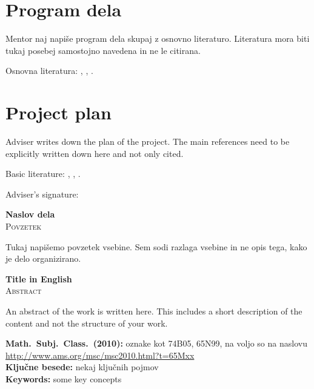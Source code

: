 \documentclass[12pt,a4paper,twoside]{article}
\newcommand{\naslovdela}{Naslov dela}
\newcommand{\englishtitle}{Title in English}
\theoremstyle{definition} %
\theoremstyle{plain} %
\numberwithin{equation}{section}  %
\begin{document}
\section*{Program dela}
Mentor naj napiše program dela skupaj z osnovno literaturo. Literatura mora biti tukaj posebej
samostojno navedena in ne le citirana.

Osnovna literatura: \cite{lebedev2009introduction}, \cite{gurtin1982introduction},
\cite{zienkiewicz2000finite}.

\section*{Project plan}
Adviser writes down the plan of the project. The main references need to be
explicitly written down here and not only cited.

Basic literature: \cite{lebedev2009introduction}, \cite{gurtin1982introduction},
\cite{zienkiewicz2000finite}.

\vspace{2cm}
\hspace*{\fill} Adviser's signature: \phantom{prostor za podpis}


\cleardoublepage
{}

\begin{center}
\textbf{\naslovdela} \\[3mm]
\textsc{Povzetek} \\[2mm]
\end{center}
Tukaj napišemo povzetek vsebine. Sem sodi razlaga vsebine in ne opis tega, kako je delo
organizirano.

\vfill
\begin{center}
\textbf{\englishtitle} \\[3mm] %
\textsc{Abstract}\\[2mm]
\end{center}

An abstract of the work is written here. This includes a short description of
the content and not the structure of your work.

\vfill\noindent
\textbf{Math.~Subj.~Class.~(2010):} oznake kot 74B05, 65N99, na voljo so na naslovu
\url{http://www.ams.org/msc/msc2010.html?t=65Mxx} \\[1mm]
\textbf{Ključne besede:} nekaj ključnih pojmov \\[1mm]
\textbf{Keywords:} some key concepts
\end{document}
